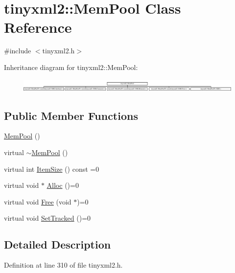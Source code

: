 \hypertarget{classtinyxml2_1_1_mem_pool}{\section{tinyxml2\+:\+:Mem\+Pool Class Reference}
\label{classtinyxml2_1_1_mem_pool}
}


{\ttfamily \#include $<$tinyxml2.\+h$>$}

Inheritance diagram for tinyxml2\+:\+:Mem\+Pool\+:\begin{figure}[H]
\begin{center}
\leavevmode
\includegraphics[height=0.691358cm]{classtinyxml2_1_1_mem_pool}
\end{center}
\end{figure}
\subsection*{Public Member Functions}
\begin{DoxyCompactItemize}
\item 
\hyperlink{classtinyxml2_1_1_mem_pool_a9101a0083d7370c85bd5aaaba7157f84}{Mem\+Pool} ()
\item 
virtual \hyperlink{classtinyxml2_1_1_mem_pool_ae55ad9e3faeca702e6ccbb38fdbcad72}{$\sim$\+Mem\+Pool} ()
\item 
virtual int \hyperlink{classtinyxml2_1_1_mem_pool_a0c518d49e3a94bde566f61e13b7240bb}{Item\+Size} () const =0
\item 
virtual void $\ast$ \hyperlink{classtinyxml2_1_1_mem_pool_a4f977b5fed752c0bbfe5295f469d6449}{Alloc} ()=0
\item 
virtual void \hyperlink{classtinyxml2_1_1_mem_pool_a49e3bfac2cba2ebd6776b31e571f64f7}{Free} (void $\ast$)=0
\item 
virtual void \hyperlink{classtinyxml2_1_1_mem_pool_ac5804dd1387b2e4de5eef710076a0db1}{Set\+Tracked} ()=0
\end{DoxyCompactItemize}


\subsection{Detailed Description}


Definition at line 310 of file tinyxml2.\+h.



